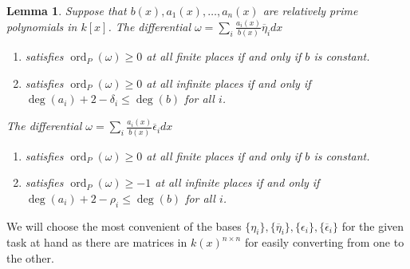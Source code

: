 \documentclass[12pt,reqno]{amsart}
\numberwithin{equation}{section}
\newtheorem{lemma}[theorem]{Lemma}
\newcommand{\op}[1]  { \operatorname{ #1 }}
\begin{document}
\begin{lemma}
\label{lemma_difford}
Suppose that $b(x),a_1(x),\dots,a_n(x)$ are relatively prime polynomials in $k[x]$. The differential $\omega = \sum_i \frac{a_i(x)}{b(x)} \overline{\eta}_i dx$
\begin{enumerate}
 \item satisfies $\operatorname{ord}_{P}(\omega) \ge 0$ at all finite places if and only if $b$ is constant.
 \item satisfies $\operatorname{ord}_{P}(\omega) \ge 0$ at all infinite places if and only if $\op{deg}(a_i) + 2-\delta_i \le \op{deg}(b)$ for all $i$.
\end{enumerate}
The differential $ \omega = \sum_i \frac{a_i(x)}{b(x)} \overline{\epsilon}_i dx$
\begin{enumerate}
 \item satisfies $\operatorname{ord}_{P}(\omega) \ge 0$ at all finite places if and only if $b$ is constant.
 \item satisfies $\operatorname{ord}_{P}(\omega) \ge -1$ at all infinite places if and only if $\op{deg}(a_i) + 2-\rho_i \le \op{deg}(b)$ for all $i$.
\end{enumerate}
\end{lemma}

We will choose the most convenient of the bases $\{\eta_i\},\{\overline{\eta}_i\},\{\epsilon_i\},\{\overline{\epsilon}_i\}$ for the given task at hand as there are matrices in $k(x)^{n \times n}$ for easily converting from one to the other.
\end{document}
